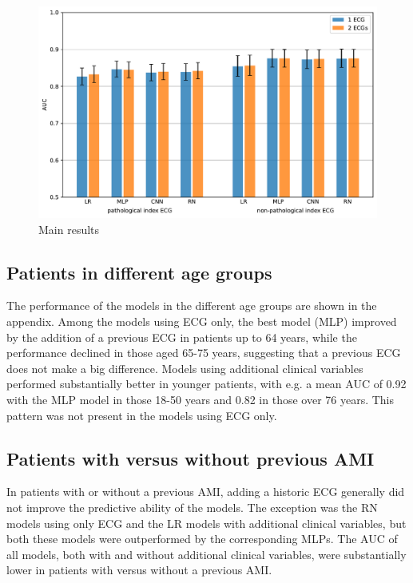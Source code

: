 \documentclass[preprint]{elsarticle}
\begin{document}
\begin{figure}[h!]
    \includegraphics[scale=0.6]{path_results.pdf}
    \caption{Main results}
    \label{fig:pathresults}
\end{figure}

\subsection{Patients in different age groups}
The performance of the models in the different age groups are shown in the appendix. Among the models using ECG only, the best model (MLP) improved by the addition of a previous ECG in patients up to 64 years, while the performance declined in those aged 65-75 years, suggesting that a previous ECG does not make a big difference. Models using additional clinical variables performed substantially better in younger patients, with e.g. a mean AUC of 0.92 with the MLP model in those 18-50 years and 0.82 in those over 76 years. This pattern was not present in the models using ECG only.

\subsection{Patients with versus without previous AMI}
In patients with or without a previous AMI, adding a historic ECG generally did not improve the predictive ability of the models. The exception was the RN models using only ECG and the LR models with additional clinical variables, but both these models were outperformed by the corresponding MLPs. The AUC of all models, both with and without additional clinical variables, were substantially lower in patients with versus without a previous AMI. 
\end{document}
